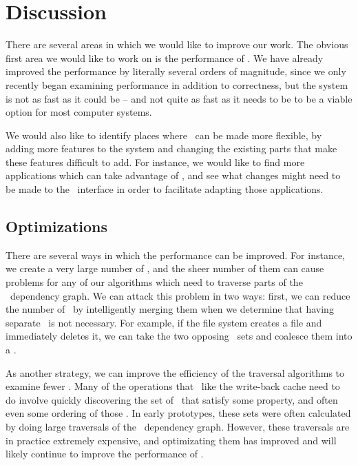\section {Discussion}
\label{sec:discussion}

There are several areas in which we would like to improve our work. The obvious
first area we would like to work on is the performance of \Kudos. We have
already improved the performance by literally several orders of magnitude, since
we only recently began examining performance in addition to correctness, but the
system is not as fast as it could be -- and not quite as fast as it needs to be
to be a viable option for most computer systems.

We would also like to identify places where \Kudos\ can be made more flexible,
by adding more features to the system and changing the existing parts that make
these features difficult to add. For instance, we would like to find more
applications which can take advantage of \opgroups, and see what changes might
need to be made to the \opgroup\ interface in order to facilitate adapting those
applications.

\subsection {Optimizations}

There are several ways in which the performance can be improved. For instance,
we create a very large number of \chdescs, and the sheer number of them can
cause problems for any of our algorithms which need to traverse parts of the
\chdesc\ dependency graph. We can attack this problem in two ways: first, we can
reduce the number of \chdescs\ by intelligently merging them when we determine
that having separate \chdescs\ is not necessary. For example, if the file system
creates a file and immediately deletes it, we can take the two opposing
\chdescs\ sets and coalesce them into a \noop.

As another strategy, we can improve the efficiency of the traversal algorithms
to examine fewer \chdescs. Many of the operations that \modules\ like the
write-back cache need to do involve quickly discovering the set of \chdescs\
that satisfy some property, and often even some ordering of those \chdescs. In
early prototypes, these sets were often calculated by doing large traversals of
the \chdesc\ dependency graph. However, these traversals are in practice
extremely expensive, and optimizating them has improved and will likely continue
to improve the performance of \Kudos.

